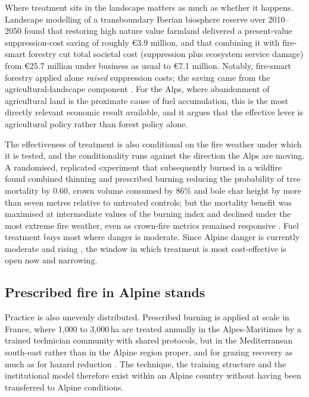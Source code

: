 \documentclass[11pt,a4paper]{article}
\begin{document}
Where treatment sits in the landscape matters as much as whether it happens. Landscape modelling of a transboundary Iberian biosphere reserve over 2010--2050 found that restoring high nature value farmland delivered a present-value suppression-cost saving of roughly €3.9 million, and that combining it with fire-smart forestry cut total societal cost (suppression plus ecosystem service damage) from €25.7 million under business as usual to €7.1 million. Notably, fire-smart forestry applied alone \emph{raised} suppression costs; the saving came from the agricultural-landscape component \citep{lecinadiaz_incorporating_2023}. For the Alps, where abandonment of agricultural land is the proximate cause of fuel accumulation, this is the most directly relevant economic result available, and it argues that the effective lever is agricultural policy rather than forest policy alone.

The effectiveness of treatment is also conditional on the fire weather under which it is tested, and the conditionality runs against the direction the Alps are moving. A randomised, replicated experiment that subsequently burned in a wildfire found combined thinning and prescribed burning reducing the probability of tree mortality by 0.60, crown volume consumed by 86\% and bole char height by more than seven metres relative to untreated controls; but the mortality benefit was maximised at intermediate values of the burning index and declined under the most extreme fire weather, even as crown-fire metrics remained responsive \citep{brodie_forest_2024}. Fuel treatment buys most where danger is moderate. Since Alpine danger is currently moderate and rising \citep{gerberding_mapping_2025, miller_climate_2024}, the window in which treatment is most cost-effective is open now and narrowing.

\subsection{Prescribed fire in Alpine stands}

Practice is also unevenly distributed. Prescribed burning is applied at scale in France, where 1{,}000 to 3{,}000\,ha are treated annually in the Alpes-Maritimes by a trained technician community with shared protocols, but in the Mediterranean south-east rather than in the Alpine region proper, and for grazing recovery as much as for hazard reduction \citep{muller_forest_2020}. The technique, the training structure and the institutional model therefore exist within an Alpine country without having been transferred to Alpine conditions.
\end{document}
